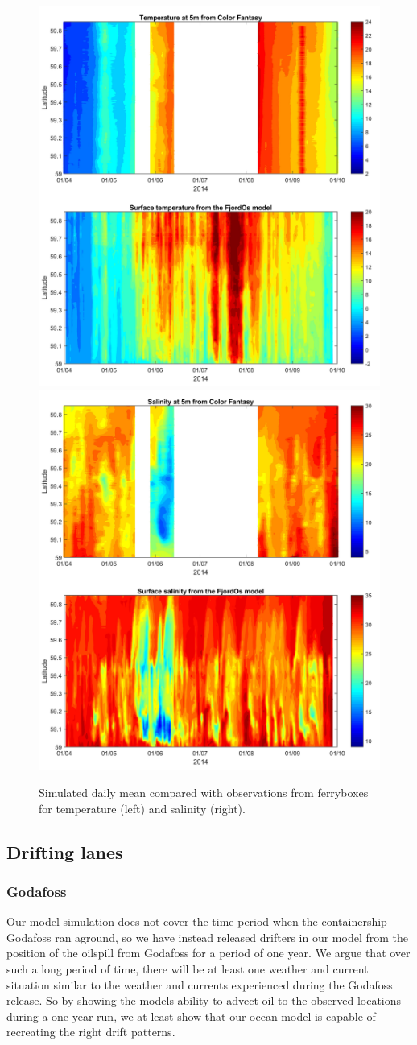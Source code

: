 \begin{figure}[ht]
\centerline{
\includegraphics*[trim=1cm 0cm 1cm 0cm,clip=true,width=.5\textwidth]{Figurer/FjordOs_vs_Ferrybox_TEMP}
\includegraphics*[trim=1cm 0cm 1cm 0cm,clip=true,width=.5\textwidth]{Figurer/FjordOs_vs_Ferrybox_SALT}}
\caption{\small
Simulated daily mean compared with observations from ferryboxes for temperature (left) and salinity (right).}
\label{fig:Ferrybox_temp_salt}
\end{figure}


\clearpage 

\subsection{Drifting lanes}
\subsubsection{Godafoss}
\label{sect:godafoss_model}
Our model simulation does not cover the time period when the containership Godafoss ran aground, so we have instead released drifters in our model from the position of the oilspill from Godafoss for a period of one year. We argue that over such a long period of time, there will be at least one weather and current situation similar to the weather and currents experienced during the Godafoss release. So by showing the models ability to advect oil to the observed locations during a one year run, we at least show that our ocean model is capable of recreating the right drift patterns.

